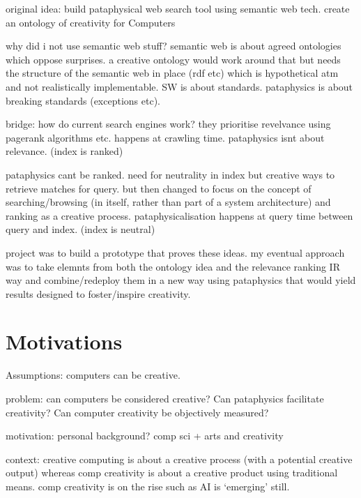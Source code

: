 \grule

original idea:
build pataphysical web search tool using semantic web tech.
create an ontology of creativity for Computers

why did i not use semantic web stuff?
semantic web is about agreed ontologies which oppose surprises. a creative ontology would work around that but needs the structure of the semantic web in place (rdf etc) which is hypothetical atm and not realistically implementable. SW is about standards. pataphysics is about breaking standards (exceptions etc).

bridge: how do current search engines work? they prioritise revelvance using pagerank algorithms etc. happens at crawling time. pataphysics isnt about relevance. (index is ranked)

pataphysics cant be ranked. need for neutrality in index but creative ways to retrieve matches for query.
but then changed to focus on the concept of searching/browsing (in itself, rather than part of a system architecture) and ranking as a creative process.
pataphysicalisation happens at query time between query and index. (index is neutral)

project was to build a prototype that proves these ideas.
my eventual approach was to take elemnts from both the ontology idea and the relevance ranking IR way and combine/redeploy them in a new way using pataphysics that would yield results designed to foster/inspire creativity.




\section{Motivations}

Assumptions: computers can be creative.

problem: can computers be considered creative? Can pataphysics facilitate creativity? Can computer creativity be objectively measured?

motivation: personal background? comp sci + arts and creativity

context: creative computing is about a creative process (with a potential creative output) whereas comp creativity is about a creative product using traditional means. comp creativity is on the rise such as AI is `emerging' still.

